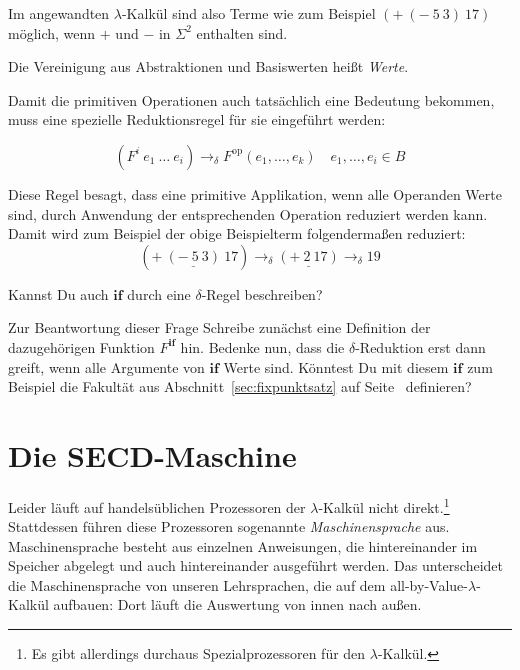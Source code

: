%
Im angewandten $\lambda$-Kalkül sind also
Terme wie zum Beispiel $(+~(-~5~3)~17)$ möglich, wenn $+$ und $-$ in
$\Sigma^2$ enthalten sind.
%
\begin{definition}\label{def:wert-angewandt}
  Die Vereinigung aus Abstraktionen und
  Basiswerten heißt \textit{Werte}.
\end{definition}
%
Damit die primitiven Operationen auch tatsächlich eine Bedeutung
bekommen, muss eine spezielle Reduktionsregel für sie eingeführt
werden:
%
\begin{definition}
\begin{displaymath}
  (F^i~e_1~\ldots~e_i) \rightarrow_{\delta} F^{\textrm{op}}(e_1, \ldots, e_k)
  \quad e_1, \ldots, e_i \in B
\end{displaymath}
\end{definition}
%
Diese Regel besagt, dass eine primitive Applikation, wenn alle
Operanden Werte sind, durch Anwendung der entsprechenden Operation 
reduziert werden kann.  Damit wird zum Beispiel der
obige Beispielterm folgendermaßen reduziert:
%
\begin{displaymath}
  (+~\underline{(-~5~3)}~17) \rightarrow_{\delta} \underline{(+~2~17)} \rightarrow_{\delta} 19
\end{displaymath}
%
\begin{aufgabeinline}
  Kannst Du auch $\mathbf{if}$ durch eine $\delta$-Regel beschreiben?

  Zur Beantwortung dieser Frage Schreibe zunächst eine Definition der
  dazugehörigen Funktion $F^\mathbf{if}$ hin.  Bedenke nun, dass die
  $\delta$-Reduktion erst dann greift, wenn alle Argumente von
  $\mathbf{if}$ Werte sind.  Könntest Du mit diesem $\mathbf{if}$ zum
  Beispiel die Fakultät aus Abschnitt~\ref{sec:fixpunktsatz} auf
  Seite~\pageref{sec:fixpunktsatz} definieren?
\end{aufgabeinline}


\section{Die SECD-Maschine}

Leider läuft auf handelsüblichen Prozessoren der $\lambda$-Kalkül
nicht direkt.\footnote{Es gibt allerdings durchaus Spezialprozessoren
  für den $\lambda$-Kalkül.} Stattdessen führen diese Prozessoren
sogenannte \textit{Maschinensprache} aus.  
Maschinensprache besteht aus einzelnen Anweisungen, die hintereinander
im Speicher abgelegt und auch hintereinander ausgeführt werden.  Das
unterscheidet die Maschinensprache von unseren Lehrsprachen, die auf
dem  all-by-Value-$\lambda$-Kalkül
aufbauen: Dort läuft die Auswertung von innen nach außen.

